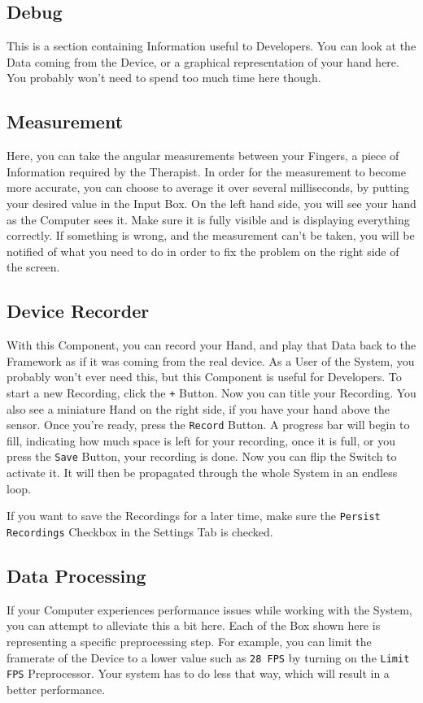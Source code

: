 \subsection{Debug}
This is a section containing Information useful to Developers. You can look at the Data coming from the Device, or a graphical representation of your hand here. You probably won't need to spend too much time here though.

\subsection{Measurement}
Here, you can take the angular measurements between your Fingers, a piece of Information required by the Therapist. In order for the measurement to become more accurate, you can choose to average it over several milliseconds, by putting your desired value in the Input Box. On the left hand side, you will see your hand as the Computer sees it. Make sure it is fully visible and is displaying everything correctly. If something is wrong, and the measurement can't be taken, you will be notified of what you need to do in order to fix the problem on the right side of the screen.

\subsection{Device Recorder}
With this Component, you can record your Hand, and play that Data back to the Framework as if it was coming from the real device. As a User of the System, you probably won't ever need this, but this Component is useful for Developers. To start a new Recording, click the \texttt{+} Button. Now you can title your Recording. You also see a miniature Hand on the right side, if you have your hand above the sensor. Once you're ready, press the \texttt{Record} Button. A progress bar will begin to fill, indicating how much space is left for your recording, once it is full, or you press the \texttt{Save} Button, your recording is done. Now you can flip the Switch to activate it. It will then be propagated through the whole System in an endless loop.

If you want to save the Recordings for a later time, make sure the \texttt{Persist Recordings} Checkbox in the Settings Tab is checked.

\subsection{Data Processing}
If your Computer experiences performance issues while working with the System, you can attempt to alleviate this a bit here. Each of the Box shown here is representing a specific preprocessing step. For example, you can limit the framerate of the Device to a lower value such as \texttt{28 FPS} by turning on the \texttt{Limit FPS} Preprocessor. Your system has to do less that way, which will result in a better performance.

